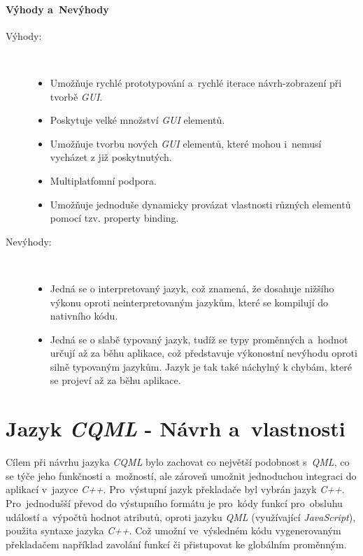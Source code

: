 \documentclass[11pt,twoside,a4paper]{book}
\begin{document}
\subsubsection{Výhody a~Nevýhody}
\begin{description}
\item[Výhody:] ~
\begin{itemize}
  \item Umožňuje rychlé prototypování a~rychlé iterace návrh-zobrazení při tvorbě \textit{GUI}.
  \item Poskytuje velké množství \textit{GUI} elementů.
  \item Umožňuje tvorbu nových \textit{GUI} elementů, které mohou i~nemusí vycházet z již poskytnutých.
  \item Multiplatfomní podpora.
  \item Umožňuje jednoduše dynamicky provázat vlastnosti různých elementů pomocí tzv. property binding.
\end{itemize}
\item[Nevýhody:] ~
\begin{itemize}
  \item Jedná se o interpretovaný jazyk, což znamená, že dosahuje nižšího výkonu oproti neinterpretovaným jazykům, které se kompilují do nativního kódu.
  \item Jedná se o slabě typovaný jazyk, tudíž se typy proměnných a~hodnot určují až za běhu aplikace, což představuje výkonostní nevýhodu oproti silně typovaným jazykům. Jazyk je tak také náchylný k chybám, které se projeví až za běhu aplikace.
\end{itemize}
\end{description}







\chapter[Jazyk \textit{CQML}]{\label{SEC:CQML}Jazyk \textit{CQML} - Návrh a~vlastnosti}
Cílem při návrhu jazyka \textit{CQML} bylo zachovat co největší podobnost s~\textit{QML}, co se týče jeho funkčnosti a~možností, ale zároveň umožnit jednoduchou integraci do aplikací v~jazyce \textit{C++}. Pro~výstupní jazyk překladače byl vybrán jazyk \textit{C++}. Pro~jednodušší převod do výstupního formátu je pro~kódy funkcí pro~obsluhu událostí a~výpočtů hodnot atributů, oproti jazyku \textit{QML} (využívající \textit{JavaScript}), použita syntaxe jazyka \textit{C++}. Což umožní ve~výsledném kódu vygenerovaným překladačem například zavolání funkcí či přistupovat ke globálním proměnným.\\
\end{document}

